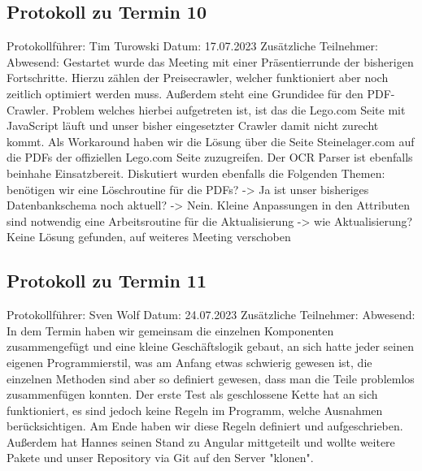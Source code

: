 \subsection{Protokoll zu Termin 10}
Protokollführer: Tim Turowski\newline
Datum: 17.07.2023 \newline
Zusätzliche Teilnehmer:  \newline
Abwesend: \newline \newline
Gestartet wurde das Meeting mit einer Präsentierrunde der bisherigen Fortschritte. Hierzu zählen der Preisecrawler, welcher funktioniert aber noch zeitlich optimiert werden muss. Außerdem steht eine Grundidee für den PDF-Crawler. Problem welches hierbei aufgetreten ist, ist das die Lego.com Seite mit JavaScript läuft und unser bisher eingesetzter Crawler damit nicht zurecht kommt. Als Workaround haben wir die Lösung über die Seite Steinelager.com auf die PDFs der offiziellen Lego.com Seite zuzugreifen. Der OCR Parser ist ebenfalls beinhahe Einsatzbereit. Diskutiert wurden ebenfalls die Folgenden Themen: \newline \newline
benötigen wir eine Löschroutine für die PDFs? -> Ja \newline
ist unser bisheriges Datenbankschema noch aktuell? -> Nein. Kleine Anpassungen in den Attributen sind notwendig \newline
eine Arbeitsroutine für die Aktualisierung -> wie Aktualisierung? Keine Lösung gefunden, auf weiteres Meeting verschoben 
\newpage
\subsection{Protokoll zu Termin 11}
Protokollführer: Sven Wolf\newline
Datum: 24.07.2023 \newline
Zusätzliche Teilnehmer:  \newline
Abwesend: \newline \newline
In dem Termin haben wir gemeinsam die einzelnen Komponenten zusammengefügt und eine kleine Geschäftslogik gebaut, an sich hatte jeder seinen eigenen Programmierstil, was am Anfang etwas schwierig gewesen ist, die einzelnen Methoden sind aber so definiert gewesen, dass man die Teile problemlos zusammenfügen konnten. Der erste Test als geschlossene Kette hat an sich funktioniert, es sind jedoch keine Regeln im Programm, welche Ausnahmen berücksichtigen. Am Ende haben wir diese Regeln definiert und aufgeschrieben. Außerdem hat Hannes seinen Stand zu Angular mittgeteilt und wollte weitere Pakete und unser Repository via Git auf den Server "klonen". 
\newpage
